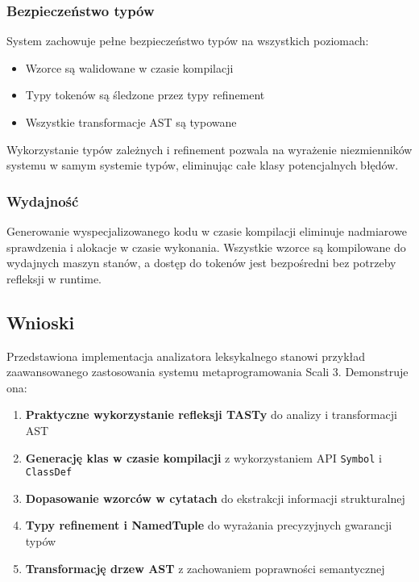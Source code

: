 \subsubsection{Bezpieczeństwo typów}\label{subsubsec:bezpieczenstwo-typow}

System zachowuje pełne bezpieczeństwo typów na wszystkich poziomach:
\begin{itemize}
    \item Wzorce są walidowane w czasie kompilacji
    \item Typy tokenów są śledzone przez typy refinement
    \item Wszystkie transformacje AST są typowane
\end{itemize}

Wykorzystanie typów zależnych i refinement pozwala na wyrażenie niezmienników systemu w samym systemie typów, eliminując całe klasy potencjalnych błędów.

\subsubsection{Wydajność}\label{subsubsec:wydajnosc}

Generowanie wyspecjalizowanego kodu w czasie kompilacji eliminuje nadmiarowe sprawdzenia i alokacje w czasie wykonania.
Wszystkie wzorce są kompilowane do wydajnych maszyn stanów, a dostęp do tokenów jest bezpośredni bez potrzeby refleksji w runtime.

\subsection{Wnioski}\label{subsec:wnioski}

Przedstawiona implementacja analizatora leksykalnego stanowi przykład zaawansowanego zastosowania systemu metaprogramowania Scali 3.
Demonstruje ona:

\begin{enumerate}
    \item \textbf{Praktyczne wykorzystanie refleksji TASTy} do analizy i transformacji AST
    \item \textbf{Generację klas w czasie kompilacji} z wykorzystaniem API \texttt{Symbol} i \texttt{ClassDef}
    \item \textbf{Dopasowanie wzorców w cytatach} do ekstrakcji informacji strukturalnej
    \item \textbf{Typy refinement i NamedTuple} do wyrażania precyzyjnych gwarancji typów
    \item \textbf{Transformację drzew AST} z zachowaniem poprawności semantycznej
\end{enumerate}

